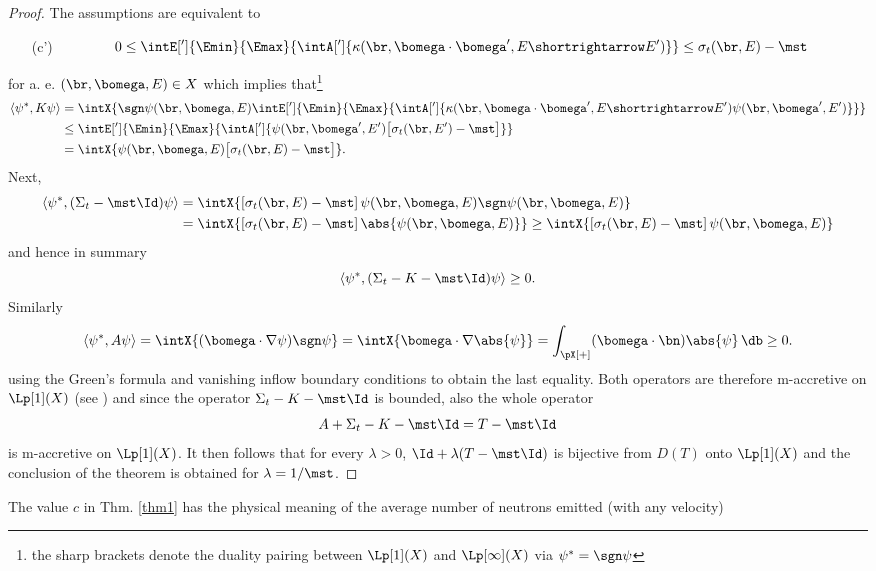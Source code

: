 \begin{proof}
  The assumptions are equivalent to 
  \begin{enumerate}
    \item[(c')] $\displaystyle\qquad\qquad 0 \leq \intE[']{\Emin}{\Emax}{\intA[']{\kappa(\br,\bomega\cdot\bomega',E\shortrightarrow E')}} \leq \sigma_t(\br,E) - \mst$
  \end{enumerate}
  for a. e. $(\br,\bomega,E) \in X$ which implies that\footnote{the sharp brackets denote the duality pairing between 
  $\Lp[1](X)$ and $\Lp[\infty](X)$ via $\psi^\ast = \sgn \psi$}
  $$
    \begin{aligned}
    \langle \psi^\ast, K\psi \rangle &= \intX{\sgn \psi(\br,\bomega,E)\intE[']{\Emin}{\Emax}{\intA[']{\kappa(\br,\bomega\cdot\bomega',E\shortrightarrow E')\psi(\br,\bomega',E')}}}\\
    & \leq 
    \intE[']{\Emin}{\Emax}{\intA[']{\psi(\br,\bomega',E') \bigl[ \sigma_t(\br,E') - \mst \bigr]}}\\ &= \intX{\psi(\br,\bomega,E) \bigl[ \sigma_t(\br,E) - \mst \bigr]}.
    \end{aligned}
  $$
  Next,  
  $$
  \begin{aligned}
    \langle \psi^\ast, (\Sigma_t - \mst\Id)\psi\rangle &= \intX{\left[\sigma_t(\br,E) - \mst\right]\psi(\br,\bomega,E)\sgn \psi(\br,\bomega,E)} \\
    & = \intX{\left[\sigma_t(\br,E) - \mst\right]\abs{\psi(\br,\bomega,E)}} \geq \intX{\left[\sigma_t(\br,E) - \mst\right]\psi(\br,\bomega,E)}
  \end{aligned}
  $$
  and hence in summary
  $$
    \langle \psi^\ast, (\Sigma_t - K - \mst\Id)\psi\rangle \geq 0.
  $$
  Similarly
  $$
    \langle \psi^\ast, A\psi\rangle = \intX{(\bomega\cdot\nabla\psi)\sgn\psi} = \intX{\bomega\cdot\nabla\abs{\psi}}
    = \int_{\pX[+]}(\bomega\cdot\bn)\abs{\psi}\,\db \geq 0.
  $$
  using the Green's formula and vanishing inflow boundary conditions to obtain the last equality.
  Both operators are therefore m-accretive on $\Lp[1](X)$ (see \cite[Chap. XVII A]{DautrayLions}) and since the operator 
  $\Sigma_t - K - \mst\Id$ is bounded, also the whole operator 
  $$
    A + \Sigma_t - K - \mst\Id = T - \mst\Id
  $$ 
  is m-accretive on $\Lp[1](X)$. It then follows that 
  for every $\lambda > 0$, $\Id + \lambda (T - \mst\Id)$ is bijective from $D(T)$ onto $\Lp[1](X)$ and the conclusion 
  of the theorem is obtained for $\lambda = 1/\mst$.
\end{proof}
The value $c$ in Thm. \ref{thm1} has the physical meaning of the average number of neutrons emitted (with any velocity) 
